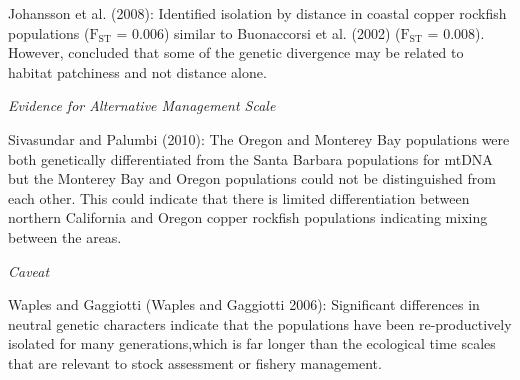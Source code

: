 \documentclass[11pt,
  english,
  a4paper,
]{article}
\begin{document}
\leavevmode\tagmcend\tagstructend\par


Johansson et al. {(2008)\leavevmode\tagmcend\tagstructend}: Identified isolation by distance in coastal copper rockfish populations ({\(\text{F}_\text{ST}\)\leavevmode\tagmcend\tagstructend} = 0.006) similar to Buonaccorsi et al. {(2002)\leavevmode\tagmcend\tagstructend} ({\(\text{F}_\text{ST}\)\leavevmode\tagmcend\tagstructend} = 0.008). However, concluded that some of the genetic divergence may be related to habitat patchiness and not distance alone.

\leavevmode\tagmcend\tagstructend\par


\emph{Evidence for Alternative Management Scale}

\leavevmode\tagmcend\tagstructend\par


Sivasundar and Palumbi {(2010)\leavevmode\tagmcend\tagstructend}: The Oregon and Monterey Bay populations were both genetically differentiated from the Santa Barbara populations for mtDNA but the Monterey Bay and Oregon populations could not be distinguished from each other. This could indicate that there is limited differentiation between northern California and Oregon copper rockfish populations indicating mixing between the areas.

\leavevmode\tagmcend\tagstructend\par


\emph{Caveat}

\leavevmode\tagmcend\tagstructend\par


Waples and Gaggiotti {(Waples and Gaggiotti 2006)\leavevmode\tagmcend\tagstructend}: Significant differences in neutral genetic characters indicate that the populations have been re-productively isolated for many generations,which is far longer than the ecological time scales that are relevant to stock assessment or fishery management.
\end{document}
